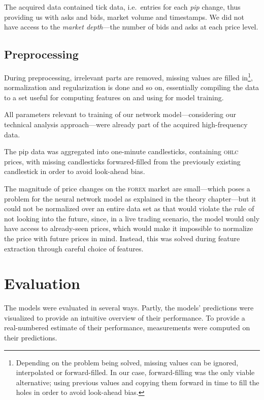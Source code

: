 \begin{multicols}{2}
The acquired data contained tick data, i.e.\ entries for each \textit{pip}
change, thus providing us with asks and bids, market volume and timestamps.
We did not have access to the \textit{market depth}---the number of bids and
asks at each price level.

\subsection{Preprocessing}

During preprocessing, irrelevant parts are removed, missing values are filled
in\footnote{Depending on the problem being solved, missing values can be
  ignored, interpolated or forward-filled.  In our case, forward-filling was the
  only viable alternative; using previous values and copying them forward in
  time to fill the holes in order to avoid look-ahead bias.}, normalization and
regularization is done and so on, essentially compiling the data to a set useful
for computing features on and using for model training.

All parameters relevant to training of our network model---considering our
technical analysis approach---were already part of the acquired high-frequency
data.

The pip data was aggregated into one-minute candlesticks, containing
\textsc{ohlc} prices, with missing candlesticks forwared-filled from the
previously existing candlestick in order to avoid look-ahead bias.

The magnitude of price changes on the \textsc{forex} market are small---which
poses a problem for the neural network model as explained in the theory
chapter---but it could not be normalized over an entire data set as that would
violate the rule of not looking into the future, since, in a live trading
scenario, the model would only have access to already-seen prices, which would
make it impossible to normalize the price with future prices in mind.  Instead,
this was solved during feature extraction through careful choice of features.

\section{Evaluation}

The models were evaluated in several ways.  Partly, the models' predictions were
visualized to provide an intuitive overview of their performance.  To provide a
real-numbered estimate of their performance, measurements were computed on their
predictions.


\end{multicols}
